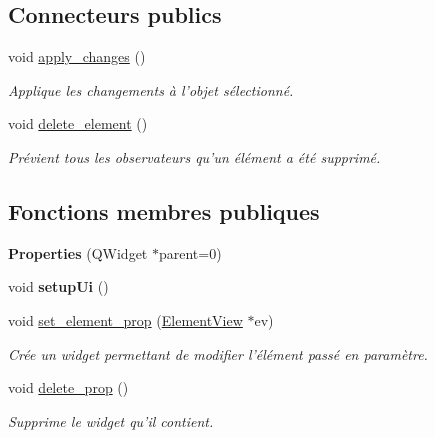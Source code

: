 \subsection*{Connecteurs publics}
\begin{DoxyCompactItemize}
\item 
\hypertarget{classProperties_aa8e9e5c83983a60486d963d2e5b97bf9}{void \hyperlink{classProperties_aa8e9e5c83983a60486d963d2e5b97bf9}{apply\+\_\+changes} ()}\label{classProperties_aa8e9e5c83983a60486d963d2e5b97bf9}

\begin{DoxyCompactList}\small\item\em Applique les changements à l’objet sélectionné. \end{DoxyCompactList}\item 
\hypertarget{classProperties_acb83b3e38f6bbe0cd57d0cf123460253}{void \hyperlink{classProperties_acb83b3e38f6bbe0cd57d0cf123460253}{delete\+\_\+element} ()}\label{classProperties_acb83b3e38f6bbe0cd57d0cf123460253}

\begin{DoxyCompactList}\small\item\em Prévient tous les observateurs qu’un élément a été supprimé. \end{DoxyCompactList}\end{DoxyCompactItemize}
\subsection*{Fonctions membres publiques}
\begin{DoxyCompactItemize}
\item 
\hypertarget{classProperties_a3b15688d359ed96e2632d2b642488a0e}{{\bfseries Properties} (Q\+Widget $\ast$parent=0)}\label{classProperties_a3b15688d359ed96e2632d2b642488a0e}

\item 
\hypertarget{classProperties_a357903294eec6fb6a410c3d54b228f74}{void {\bfseries setup\+Ui} ()}\label{classProperties_a357903294eec6fb6a410c3d54b228f74}

\item 
void \hyperlink{classProperties_a035f6ed307968ff3e06e53342c0b3843}{set\+\_\+element\+\_\+prop} (\hyperlink{classElementView}{Element\+View} $\ast$ev)
\begin{DoxyCompactList}\small\item\em Crée un widget permettant de modifier l’élément passé en paramètre. \end{DoxyCompactList}\item 
\hypertarget{classProperties_affc1d43c4a1894c71f7970b9fb58a9db}{void \hyperlink{classProperties_affc1d43c4a1894c71f7970b9fb58a9db}{delete\+\_\+prop} ()}\label{classProperties_affc1d43c4a1894c71f7970b9fb58a9db}

\begin{DoxyCompactList}\small\item\em Supprime le widget qu’il contient. \end{DoxyCompactList}\end{DoxyCompactItemize}
